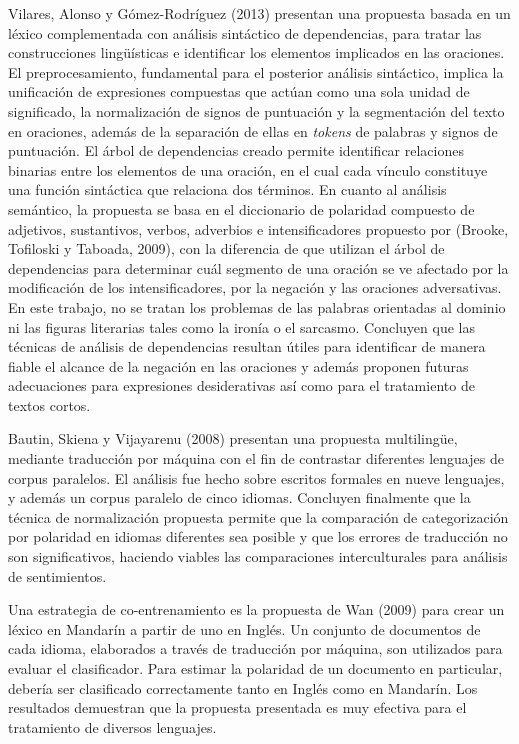 {Vilares, Alonso y G\'omez-Rodr\'iguez (2013) presentan una propuesta basada en un l\'exico complementada con an\'alisis sint\'actico de dependencias, para tratar las construcciones ling\"u\'isticas e identificar los elementos implicados en las oraciones. El preprocesamiento, fundamental para el posterior an\'alisis sint\'actico, implica la unificaci\'on de expresiones compuestas que act\'uan como una sola unidad de significado, la normalizaci\'on de signos de puntuaci\'on y la segmentaci\'on del texto en oraciones, adem\'as de la separaci\'on de ellas en \textit{tokens} de palabras y signos de puntuaci\'on. El \'arbol de dependencias creado permite identificar relaciones binarias entre los elementos de una oraci\'on, en el cual cada v\'inculo constituye una funci\'on sint\'actica que relaciona dos t\'erminos. En cuanto al an\'alisis sem\'antico, la propuesta se basa en el diccionario de polaridad compuesto de adjetivos, sustantivos, verbos, adverbios e intensificadores propuesto por (Brooke, Tofiloski y Taboada, 2009), con la diferencia de que utilizan el \'arbol de dependencias para determinar cu\'al segmento de una oraci\'on se ve afectado por la modificaci\'on de los intensificadores, por la negaci\'on y las oraciones adversativas. En este trabajo, no se tratan los problemas de las palabras orientadas al dominio ni las figuras literarias tales como la iron\'ia o el sarcasmo. Concluyen que las t\'ecnicas de an\'alisis de dependencias resultan \'utiles para identificar de manera fiable el alcance de la negaci\'on en las oraciones y adem\'as proponen futuras adecuaciones para expresiones desiderativas as\'i como para el tratamiento de textos cortos.
\newline

Bautin, Skiena y Vijayarenu (2008) presentan una propuesta multiling\"ue, mediante traducci\'on por m\'aquina con el fin de contrastar diferentes lenguajes de corpus paralelos. El an\'alisis fue hecho sobre escritos formales en nueve lenguajes, y adem\'as un corpus paralelo de cinco idiomas. Concluyen finalmente que la t\'ecnica de normalizaci\'on propuesta permite que la comparaci\'on de categorizaci\'on por polaridad en idiomas diferentes sea posible y que los errores de traducci\'on no son significativos, haciendo viables las comparaciones interculturales para an\'alisis de sentimientos.
\newline

Una estrategia de co-entrenamiento es la propuesta de Wan (2009) para crear un l\'exico en Mandar\'in a partir de uno en Ingl\'es. Un conjunto de documentos de cada idioma, elaborados a trav\'es de traducci\'on por m\'aquina, son utilizados para evaluar el clasificador. Para estimar la polaridad de un documento en particular, deber\'ia ser clasificado correctamente tanto en Ingl\'es como en Mandar\'in. Los resultados demuestran que la propuesta presentada es muy efectiva para el tratamiento de diversos lenguajes.
\newline

}

